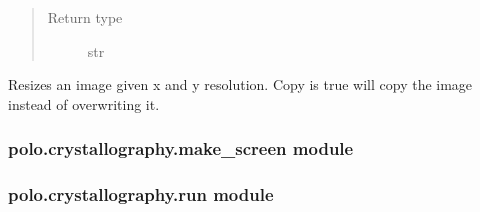 \documentclass[letterpaper,10pt,english]{sphinxmanual}
\begin{document}
\begin{fulllineitems}
\begin{fulllineitems}
\begin{quote}
\begin{description}
\item[{Return type}] \leavevmode
str

\end{description}\end{quote}

\end{fulllineitems}


\begin{fulllineitems}
\label{\detokenize{polo.crystallography:polo.crystallography.image.Image.resize}}
Resizes an image given x and y resolution. Copy is true will copy
the image instead of overwriting it.

\end{fulllineitems}


\end{fulllineitems}



\subsubsection{polo.crystallography.make\_screen module}
\label{\detokenize{polo.crystallography:polo-crystallography-make-screen-module}}

\subsubsection{polo.crystallography.run module}
\label{\detokenize{polo.crystallography:module-polo.crystallography.run}}\label{\detokenize{polo.crystallography:polo-crystallography-run-module}}
\end{document}
